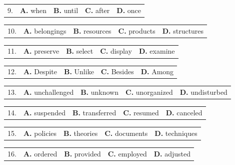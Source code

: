 \documentclass[UTF8,11pt]{ctexart}
\begin{document}
\noindent\begin{tabularx}{\linewidth}{@{}lXXXX@{}}9. & \textbf{A.} when & \textbf{B.} until & \textbf{C.} after & \textbf{D.} once\\\end{tabularx}\par

\noindent\begin{tabularx}{\linewidth}{@{}lXXXX@{}}10. & \textbf{A.} belongings & \textbf{B.} resources & \textbf{C.} products & \textbf{D.} structures\\\end{tabularx}\par

\noindent\begin{tabularx}{\linewidth}{@{}lXXXX@{}}11. & \textbf{A.} preserve & \textbf{B.} select & \textbf{C.} display & \textbf{D.} examine\\\end{tabularx}\par

\noindent\begin{tabularx}{\linewidth}{@{}lXXXX@{}}12. & \textbf{A.} Despite & \textbf{B.} Unlike & \textbf{C.} Besides & \textbf{D.} Among\\\end{tabularx}\par

\noindent\begin{tabularx}{\linewidth}{@{}lXXXX@{}}13. & \textbf{A.} unchallenged & \textbf{B.} unknown & \textbf{C.} unorganized & \textbf{D.} undisturbed\\\end{tabularx}\par

\noindent\begin{tabularx}{\linewidth}{@{}lXXXX@{}}14. & \textbf{A.} suspended & \textbf{B.} transferred & \textbf{C.} resumed & \textbf{D.} canceled\\\end{tabularx}\par

\noindent\begin{tabularx}{\linewidth}{@{}lXXXX@{}}15. & \textbf{A.} policies & \textbf{B.} theories & \textbf{C.} documents & \textbf{D.} techniques\\\end{tabularx}\par

\noindent\begin{tabularx}{\linewidth}{@{}lXXXX@{}}16. & \textbf{A.} ordered & \textbf{B.} provided & \textbf{C.} employed & \textbf{D.} adjusted\\\end{tabularx}\par
\end{document}
